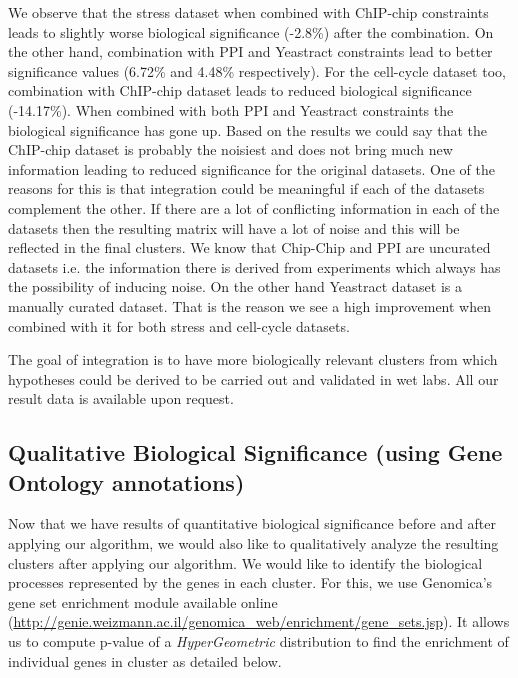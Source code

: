 We observe that the stress dataset when combined with ChIP-chip constraints leads to 
slightly worse biological significance (-2.8\%) after the combination. On the other hand, combination with PPI and Yeastract constraints lead to better significance values (6.72\% and 4.48\% respectively). For 
the cell-cycle dataset too, combination with ChIP-chip dataset leads to reduced biological significance (-14.17\%). When combined with both PPI and Yeastract constraints the biological significance 
has gone up. Based on the results we could say that the ChIP-chip dataset is probably the noisiest and does not bring much new information leading to reduced significance for the original datasets. 
One of the reasons for this is that integration could be meaningful if each of the datasets complement the other. If there are 
a lot of conflicting information in each of the datasets then the resulting matrix will have a lot of noise and this will be reflected in the final clusters. We know that Chip-Chip and PPI are uncurated datasets i.e. the information there is derived from experiments which always has the possibility of inducing noise. On the other hand Yeastract 
dataset is a manually curated dataset. That is the reason we see a high improvement when combined with it for both stress and cell-cycle datasets. 
  
The goal of integration is to have more biologically relevant clusters from which hypotheses could be derived to be carried out and validated in wet labs. All our result data is available upon request. 

\subsection{Qualitative Biological Significance (using Gene Ontology annotations)} \label{semisup_biosig_go}
Now that we have results of quantitative biological significance before and after applying our algorithm, we would also like to qualitatively analyze the resulting clusters after 
applying our algorithm. We would like to identify the biological processes represented by the genes in each cluster. For this, we use Genomica's gene set enrichment module available online (\url{http://genie.weizmann.ac.il/genomica_web/enrichment/gene_sets.jsp}). It allows us to compute 
p-value of a \textit{HyperGeometric} distribution to find the enrichment of individual genes in cluster as detailed below.

